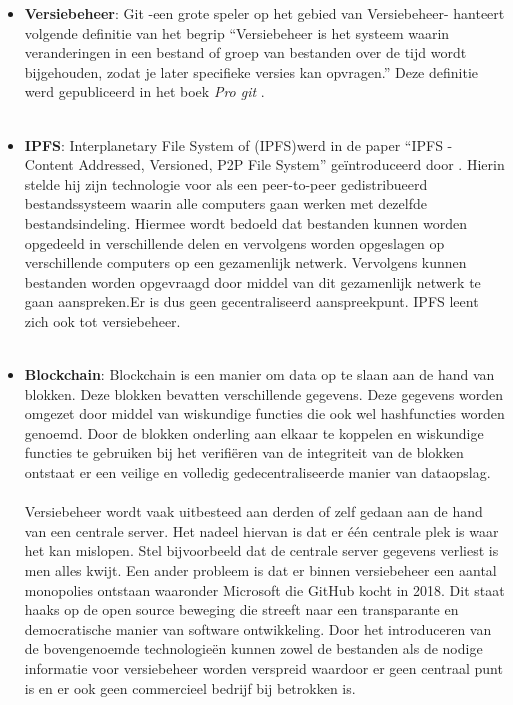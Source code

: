 \begin{itemize}
\item \textbf{Versiebeheer}: Git -een grote speler op het gebied van Versiebeheer- hanteert volgende definitie van het begrip “Versiebeheer is het systeem waarin veranderingen in een bestand of groep van bestanden over de tijd wordt bijgehouden, zodat je later specifieke versies kan opvragen.” Deze definitie werd gepubliceerd in het boek \textit{Pro git} \autocite{Chacon2014}. \\\\

\item \textbf{IPFS}: Interplanetary File System of (IPFS)werd in de paper “IPFS - Content Addressed, Versioned, P2P File System” geïntroduceerd door \textcite{Benet2014}. Hierin stelde hij zijn technologie voor als een peer-to-peer gedistribueerd bestandssysteem waarin alle computers gaan werken met dezelfde bestandsindeling. Hiermee wordt bedoeld dat bestanden kunnen worden opgedeeld  in verschillende delen en vervolgens worden opgeslagen op verschillende computers op een gezamenlijk netwerk. Vervolgens kunnen bestanden worden opgevraagd door middel van dit gezamenlijk netwerk te gaan aanspreken.Er is dus geen gecentraliseerd aanspreekpunt. IPFS leent zich ook tot versiebeheer.\\\\

\item \textbf{Blockchain}: Blockchain is een manier om data op te slaan aan de hand van blokken. Deze blokken bevatten verschillende gegevens. Deze gegevens worden omgezet door middel van wiskundige functies die ook wel hashfuncties worden genoemd. Door de blokken onderling aan elkaar te koppelen en wiskundige functies te gebruiken bij het verifiëren van de integriteit van de blokken ontstaat er een veilige en volledig gedecentraliseerde manier van dataopslag.\\\\

Versiebeheer wordt vaak uitbesteed aan derden of zelf gedaan aan de hand van een centrale server. Het nadeel hiervan is dat er één centrale plek is waar het kan mislopen. Stel bijvoorbeeld dat de centrale server gegevens verliest is men alles kwijt. Een ander probleem is dat er binnen versiebeheer een aantal monopolies ontstaan waaronder Microsoft die GitHub kocht in 2018.  Dit staat haaks op de open source beweging die streeft naar een transparante en democratische manier van software ontwikkeling. Door het introduceren van de bovengenoemde technologieën kunnen zowel de bestanden als de nodige informatie voor versiebeheer worden verspreid waardoor er geen centraal punt is en er ook geen commercieel bedrijf bij betrokken is.
\end{itemize}

